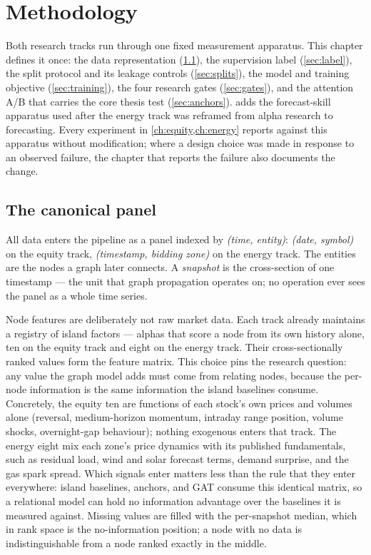 \chapter{Methodology}
\label{ch:methodology}

Both research tracks run through one fixed measurement apparatus. This
chapter defines it once: the data representation
(\cref{sec:panel}), the supervision label (\cref{sec:label}), the split
protocol and its leakage controls (\cref{sec:splits}), the model and
training objective (\cref{sec:training}), the four research gates
(\cref{sec:gates}), and the attention A/B that carries the core thesis
test (\cref{sec:anchors}).  adds the forecast-skill
apparatus used after the energy track was reframed from alpha research to
forecasting. Every experiment in \cref{ch:equity,ch:energy} reports
against this apparatus without modification; where a design choice was
made in response to an observed failure, the chapter that reports the
failure also documents the change.

\section{The canonical panel}
\label{sec:panel}

All data enters the pipeline as a panel indexed by \emph{(time, entity)}:
\emph{(date, symbol)} on the equity track, \emph{(timestamp, bidding
zone)} on the energy track. The entities are the nodes a graph later
connects. A \emph{snapshot} is the cross-section of one timestamp --- the
unit that graph propagation operates on; no operation ever sees the panel
as a whole time series.

Node features are deliberately not raw market data. Each track already
maintains a registry of island factors --- alphas that score a node from
its own history alone, ten on the equity track and eight on the energy
track. Their cross-sectionally ranked values form the feature matrix.
This choice pins the research question: any value the graph model adds
must come from relating nodes, because the per-node information is
the same information the island baselines consume. Concretely, the
equity ten are functions of each stock's own prices and volumes alone
(reversal, medium-horizon momentum, intraday range position, volume
shocks, overnight-gap behaviour); nothing exogenous enters that track.
The energy eight mix each zone's price dynamics with its published
fundamentals, such as residual load, wind and solar forecast terms,
demand surprise, and the gas spark spread. Which signals enter matters
less than the rule that they enter everywhere: island baselines,
anchors, and GAT consume this identical matrix, so a relational model
can hold no information advantage over the baselines it is measured
against. Missing values are
filled with the per-snapshot median, which in rank space is the
no-information position; a node with no data is indistinguishable from a
node ranked exactly in the middle.


